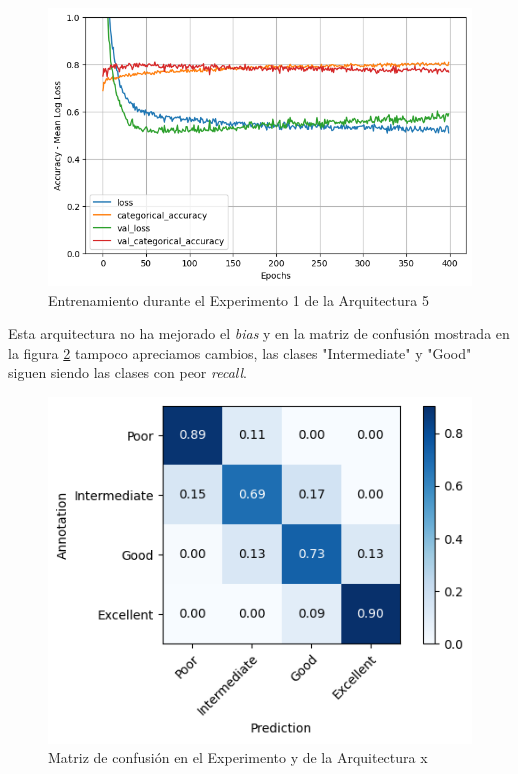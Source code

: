 \documentclass{article}
\begin{document}
			\begin{figure}[!h]
				\begin{center}
					\includegraphics[scale=0.5]{d-tr-a5-e1.png}		
					\caption{Entrenamiento durante el Experimento 1 de la Arquitectura 5}	
					\label{d-tr-a5-e1}
				\end{center}
			\end{figure}
			Esta arquitectura no ha mejorado el \textit{bias} y en la matriz de confusi\'on mostrada en la figura \ref{d-cm-a5-e2} tampoco apreciamos cambios, las clases "Intermediate" y "Good" siguen siendo las clases con peor \textit{recall}.
			\begin{figure}[!h]
				\begin{center}
					\includegraphics[scale=0.7]{d-cm-a5-e2.png}		
					\caption{Matriz de confusi\'on en el Experimento y de la Arquitectura x}	
					\label{d-cm-a5-e2}
				\end{center}
			\end{figure}
		
\end{document}
